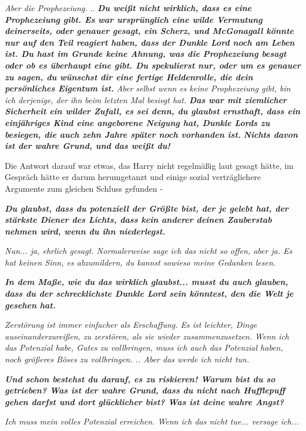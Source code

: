 \emph{Aber die Prophezeiung.} .. \textbf{\emph{\glqq{}Du weißt nicht wirklich,
dass es eine Prophezeiung gibt. Es war ursprünglich eine wilde Vermutung
deinerseits, oder genauer gesagt, ein Scherz, und McGonagall könnte nur auf den
Teil reagiert haben, dass der Dunkle Lord noch am Leben ist. Du hast im Grunde
keine Ahnung, was die Prophezeiung besagt oder ob es überhaupt eine gibt. Du
spekulierst nur, oder um es genauer zu sagen, du wünschst dir eine fertige
Heldenrolle, die dein persönliches Eigentum ist.\grqq{}}} \emph{Aber selbst wenn
es keine Prophezeiung gibt, bin ich derjenige, der ihn beim letzten Mal besiegt
hat.} \textbf{\emph{\glqq{}Das war mit ziemlicher Sicherheit ein wilder Zufall,
es sei denn, du glaubst ernsthaft, dass ein einjähriges Kind eine angeborene
Neigung hat, Dunkle Lords zu besiegen, die auch zehn Jahre später noch vorhanden
ist.} }\textbf{\emph{Nichts davon ist der wahre Grund, und das weißt
du!\grqq{}}}

Die Antwort darauf war etwas, das Harry nicht regelmäßig laut gesagt hätte, im
Gespräch hätte er darum herumgetanzt und einige sozial verträglichere Argumente
zum gleichen Schluss gefunden -

\textbf{\emph{\glqq{}Du glaubst, dass du potenziell der Größte bist, der je
gelebt hat, der stärkste Diener des Lichts, dass kein anderer deinen Zauberstab
nehmen wird, wenn du ihn niederlegst.\grqq{}}}

\emph{Nun... ja, ehrlich gesagt. Normalerweise sage ich das nicht so offen, aber
ja. Es hat keinen Sinn, es abzumildern, du kannst sowieso meine Gedanken lesen.}

\textbf{\emph{\glqq{}In dem Maße, wie du das wirklich glaubst... musst du auch
glauben, dass du der schrecklichste Dunkle Lord sein könntest, den die Welt je
gesehen hat.\grqq{}}}

\emph{Zerstörung ist immer einfacher als Erschaffung. Es ist leichter, Dinge
auseinanderzureißen, zu zerstören, als sie wieder zusammenzusetzen. Wenn ich das
Potenzial habe, Gutes zu vollbringen, muss ich auch das Potenzial haben, noch
größeres Böses zu vollbringen. .. Aber das werde ich nicht tun.}

\textbf{\emph{\glqq{}Und schon bestehst du darauf, es zu riskieren! Warum bist du
so getrieben? Was ist der wahre Grund, dass du nicht nach Hufflepuff gehen
darfst und dort glücklicher bist? Was ist deine wahre Angst?\grqq{}}}

\emph{Ich muss mein volles Potenzial erreichen. Wenn ich das nicht tue...
versage ich...}

